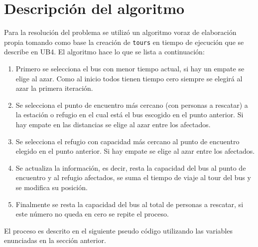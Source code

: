 \documentclass[letter, 10pt]{article}
\begin{document}
\section{Descripción del algoritmo}\label{sec:alg}
    Para la resolución del problema se utilizó un algoritmo voraz de elaboración
    propia tomando como base la creación de \texttt{tours} en tiempo de
    ejecución que se describe en UB4\cite{goerigk2013branch}. El algoritmo
    hace lo que se lista a continuación:
    \begin{enumerate}
        \item
            Primero se selecciona el bus con menor tiempo actual, si hay un
            empate se elige al azar. Como al inicio todos tienen tiempo cero
            siempre se elegirá al azar la primera iteración.
        \item
            Se selecciona el punto de encuentro más cercano (con personas a
            rescatar) a la estación o
            refugio en el cual está el bus escogido en el punto anterior. Si hay
            empate en las distancias se elige al azar entre los afectados.
        \item
            Se selecciona el refugio con capacidad más cercano al punto de 
            encuentro elegido
            en el punto anterior. Si hay empate se elige al azar entre los
            afectados.
        \item
            Se actualiza la información, es decir, resta la capacidad del bus al
            punto de encuentro y al refugio afectados, se suma el tiempo de
            viaje al tour del bus y se modifica su posición.
        \item
            Finalmente se resta la capacidad del bus al total de personas a
            rescatar, si este número no queda en cero se repite el proceso.
    \end{enumerate}

    El proceso es descrito en el siguiente pseudo código utilizando las
    variables enunciadas en la sección anterior.\\
\end{document}
